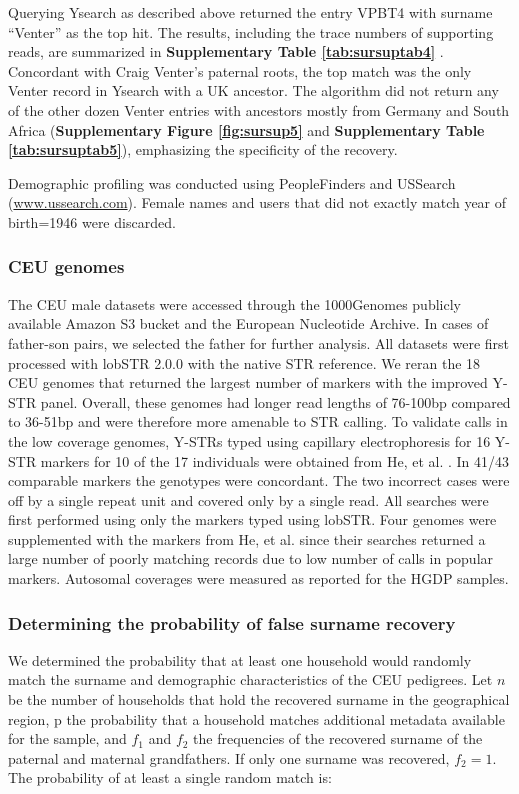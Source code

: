 Querying Ysearch as described above returned the entry VPBT4 with surname ``Venter'' as the top hit. The results, including the trace numbers of supporting reads, are summarized in \textbf{Supplementary Table \ref{tab:sursuptab4}} . Concordant with Craig Venter's paternal roots, the top match was the only Venter record in Ysearch with a UK ancestor. The algorithm did not return any of the other dozen Venter entries with ancestors mostly from Germany and South Africa (\textbf{Supplementary Figure \ref{fig:sursup5}} and \textbf{Supplementary Table \ref{tab:sursuptab5}}), emphasizing the specificity of the recovery.

Demographic profiling was conducted using PeopleFinders and USSearch (\url{www.ussearch.com}). Female names and users that did not exactly match year of birth=1946 were discarded. 

\subsubsection{CEU genomes}
The CEU male datasets were accessed through the 1000Genomes publicly available Amazon S3 bucket and the European Nucleotide Archive. In cases of father-son pairs, we selected the father for further analysis. All datasets were first processed with lobSTR 2.0.0 with the native STR reference. We reran the 18 CEU genomes that returned the largest number of markers with the improved Y-STR panel. Overall, these genomes had longer read lengths of 76-100bp compared to 36-51bp and were therefore more amenable to STR calling. To validate calls in the low coverage genomes, Y-STRs typed using capillary electrophoresis for 16 Y-STR markers for 10 of the 17 individuals were obtained from He, et al. \cite{HeGitschierZerjalEtAl2009}. In 41/43 comparable markers the genotypes were concordant. The two incorrect cases were off by a single repeat unit and covered only by a single read. All searches were first performed using only the markers typed using lobSTR. Four genomes were supplemented with the markers from He, et al. since their searches returned a large number of poorly matching records due to low number of calls in popular markers. Autosomal coverages were measured as reported for the HGDP samples.

\subsubsection{Determining the probability of false surname recovery}

We determined the probability that at least one household would randomly match the surname and demographic characteristics of the CEU pedigrees. Let $n$ be the number of households that hold the recovered surname in the geographical region, p the probability that a household matches additional metadata available for the sample, and $f_1$ and $f_2$ the frequencies of the recovered surname of the paternal and maternal grandfathers. If only one surname was recovered, $f_2=1$. The probability of at least a single random match is:

